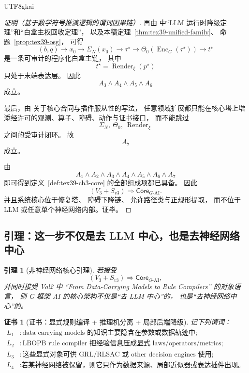 \documentclass[12pt]{article}
\newtheorem{lemma}{引理}[section]
\newtheorem{Certificate}{证书}[section]
\begin{document}
\begin{CJK*}{UTF8}{gkai}
\begin{proof}[证明（基于数学符号推演逻辑的谓词因果链）]
再由
\cite{RepoTex37SemanticGaugeRuntime}
中“LLM 运行时降级定理”和“白盒主权回收定理”，
以及本稿定理~\ref{thm:tex39-unified-family}、
命题~\ref{prop:tex39-osg}，
可得
\[
  (b,q)
  \to
  x_0
  \to
  \Sigma_N(x_0)
  \to
  \tau^\star
  \to
  \Theta_0(\operatorname{Enc}_G(\tau^\star))
  \to
  t^\star
\]
是一条可审计的程序化白盒主链，
其中
\[
  t^\star
  =
  \operatorname{Render}_{\xi}(p^\star)
\]
只处于末端表达层。
因此
\[
  A_3\wedge A_4\wedge A_5\wedge A_6
\]
成立。

最后，由
\cite{RepoTex37SemanticGaugeRuntime}
关于核心合同与插件服从性的写法，
任意领域扩展都只能在核心塔上增添经许可的观测、算子、障碍、动作与证书接口，
而不能跳过
\[
  \Sigma_N,\ \Theta_0,\ \operatorname{Render}_{\xi}
\]
之间的受审计闭环。
故
\[
  A_7
\]
成立。

由
\[
  A_1\wedge A_2\wedge A_3\wedge A_4\wedge A_5\wedge A_6\wedge A_7
\]
即可得到定义~\ref{def:tex39-ch3-core} 的全部组成项都已具备。
因此
\[
  (V_3+S_{v3})
  \Longrightarrow
  \mathsf{Core}_{G\text{-AI}}.
\]
并且系统核心位于修复塔、
障碍下降链、
允许路径类与正规形提取，
而不位于 LLM 或任意单个神经网络内部。证毕。
\end{proof}

\subsection{引理：这一步不仅是去 LLM 中心，也是去神经网络中心}
\label{subsec:tex39-ch3-lemma}

\begin{lemma}[非神经网络核心引理]
\label{lem:tex39-ch3-decenter}
若接受
\[
  (V_3+S_{v3}) \Longrightarrow \mathsf{Core}_{G\text{-AI}},
\]
并同时接受 Vol2 中
“From Data-Carrying Models to Rule Compilers”
的对象语言，
则 G 框架 AI 的核心架构不仅是“去 LLM 中心”的，
也是“去神经网络中心”的。
\end{lemma}

\begin{Certificate}[证书：显式规则编译 + 推理机分离 + 局部后端降级]
\label{cert:tex39-ch3-decenter}
记下列谓词：
\[
\begin{aligned}
  L_1 &: \text{data-carrying models 的知识主要隐含在参数或数据轨迹中};\\
  L_2 &: \text{LBOPB rule compiler 把经验信息压成显式 laws/operators/metrics};\\
  L_3 &: \text{这些显式对象可供 GRL/RLSAC 或 other decision engines 使用};\\
  L_4 &: \text{若某神经网络被保留，则它只作为数据来源、局部近似器或表达插件出现。}
\end{aligned}
\]
\end{Certificate}


\end{CJK*}
\end{document}
